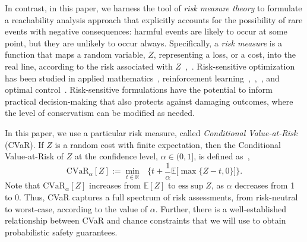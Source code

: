 \documentclass[letterpaper, 10 pt, conference]{ieeeconf}  %
\begin{document}
In contrast, in this paper, we harness the tool of \textit{risk measure theory} to formulate a reachability analysis approach that explicitly accounts for the possibility of rare events with negative consequences: 
harmful events are likely to occur at some point, but they are unlikely to occur always.
Specifically, a \textit{risk measure} is a function that maps a random variable, $Z$, representing a loss, or a cost, into the real line,
according to the risk associated with $Z$~\cite[Sec. 6.3]{shapiro2009lectures},~\cite[Sec. 2.2]{kisiala2015conditional}.
Risk-sensitive optimization
has been studied in applied mathematics~\cite{ruszczynski2010risk}, reinforcement learning~\cite{osogami2012robustness},~\cite{chow2015risk},~\cite{ratliff2017risk}, and optimal control~\cite{chow2014framework}.
Risk-sensitive formulations have the potential to inform practical decision-making that also protects against damaging outcomes, where the level of conservatism can be modified as needed.

In this paper, we use a particular risk measure, called \textit{Conditional Value-at-Risk} (CVaR).
If $Z$ is a random cost with finite expectation, then the Conditional Value-at-Risk of $Z$ at the confidence level, $\alpha \in (0,1]$,
is defined as~\cite[Equation 6.22]{shapiro2009lectures},\footnotemark
{} 
\begin{equation}
\text{CVaR}_\alpha[Z] := {\underset{t \in \mathbb{R}}\min} \text{ }\Big\{ t + \frac{1}{\alpha}\mathbb{E}\big[\max\{Z-t,0\}\big] \Big\}.
\label{cvareqn}
\end{equation}
Note that $\text{CVaR}_\alpha[Z]$ increases from $\mathbb{E}[Z]$ to $\text{ess}\sup Z$, as $\alpha$ decreases from 1 to 0.
Thus, CVaR captures a full spectrum of risk assessments, from risk-neutral to worst-case, according to the value of $\alpha$.  
Further, there is a well-established relationship between CVaR and chance constraints
that we will use to obtain probabilistic safety guarantees. 
\end{document}

